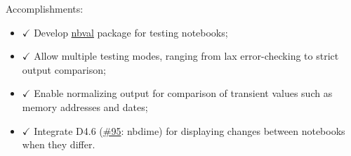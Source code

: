 Accomplishments:

\begin{itemize}
\tightlist
\item
  \(\checkmark\) Develop
  \href{https://github.com/computationalmodelling/nbval}{nbval} package
  for testing notebooks;
\item
  \(\checkmark\) Allow multiple testing modes, ranging from lax
  error-checking to strict output comparison;
\item
  \(\checkmark\) Enable normalizing output for comparison of transient
  values such as memory addresses and dates;
\item
  \(\checkmark\) Integrate D4.6
  (\href{https://github.com/OpenDreamKit/OpenDreamKit/issues/95}{\#95}:
  nbdime) for displaying changes between notebooks when they differ.
\end{itemize}
